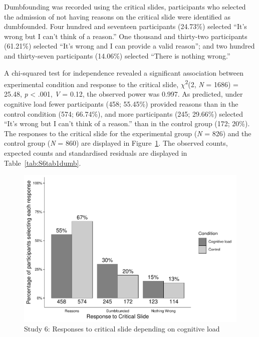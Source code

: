 \documentclass[
  american,
  man,floatsintext]{apa7}
\begin{document}
Dumbfounding was recorded using the critical slides, participants who selected the admission of not having reasons on the critical slide were identified as dumbfounded. Four hundred and seventeen participants (24.73\%) selected ``It's wrong but I can't think of a reason.'' One thousand and thirty-two participants (61.21\%) selected ``It's wrong and I can provide a valid reason''; and two hundred and thirty-seven participants (14.06\%) selected ``There is nothing wrong.''

A chi-squared test for independence revealed a significant association between experimental condition and response to the critical slide, \(\chi\)\textsuperscript{2}(2, \emph{N} = 1686) = 25.48, \emph{p} \textless{} .001, \emph{V} = 0.12, the observed power was 0.997. As predicted, under cognitive load fewer participants (458; 55.45\%) provided reasons than in the control condition (574; 66.74\%), and more participants (245; 29.66\%) selected ``It's wrong but I can't think of a reason.'' than in the control group (172; 20\%). The responses to the critical slide for the experimental group (\emph{N} = 826) and the control group (\emph{N} = 860) are displayed in Figure~\ref{fig:S6ch5S6fig1criticalconditionb}. The observed counts, expected counts and standardised residuals are displayed in Table~\ref{tab:S6tab1dumb}.

\newpage

\begin{figure}
\centering
\includegraphics{cog_load_in_chunks_files/figure-latex/S6ch5S6fig1criticalconditionb-1.pdf}
\caption{\label{fig:S6ch5S6fig1criticalconditionb}Study 6: Responses to critical slide depending on cognitive load}
\end{figure}
\end{document}
